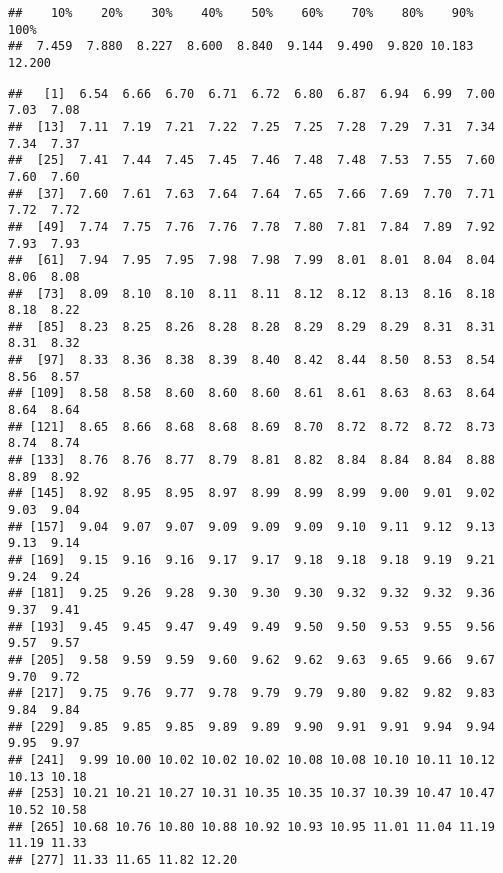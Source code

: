 \documentclass[
]{article}
\newenvironment{Shaded}{\begin{snugshade}}{\end{snugshade}}
\newcommand{\AttributeTok}[1]{\textcolor[rgb]{0.13,0.29,0.53}{#1}}
\newcommand{\DecValTok}[1]{\textcolor[rgb]{0.00,0.00,0.81}{#1}}
\newcommand{\FunctionTok}[1]{\textcolor[rgb]{0.13,0.29,0.53}{\textbf{#1}}}
\newcommand{\NormalTok}[1]{#1}
\newcommand{\SpecialCharTok}[1]{\textcolor[rgb]{0.81,0.36,0.00}{\textbf{#1}}}
\begin{document}
\begin{Shaded}
\end{Shaded}

\begin{verbatim}
##    10%    20%    30%    40%    50%    60%    70%    80%    90%   100% 
##  7.459  7.880  8.227  8.600  8.840  9.144  9.490  9.820 10.183 12.200
\end{verbatim}

\begin{Shaded}
\end{Shaded}

\begin{verbatim}
##   [1]  6.54  6.66  6.70  6.71  6.72  6.80  6.87  6.94  6.99  7.00  7.03  7.08
##  [13]  7.11  7.19  7.21  7.22  7.25  7.25  7.28  7.29  7.31  7.34  7.34  7.37
##  [25]  7.41  7.44  7.45  7.45  7.46  7.48  7.48  7.53  7.55  7.60  7.60  7.60
##  [37]  7.60  7.61  7.63  7.64  7.64  7.65  7.66  7.69  7.70  7.71  7.72  7.72
##  [49]  7.74  7.75  7.76  7.76  7.78  7.80  7.81  7.84  7.89  7.92  7.93  7.93
##  [61]  7.94  7.95  7.95  7.98  7.98  7.99  8.01  8.01  8.04  8.04  8.06  8.08
##  [73]  8.09  8.10  8.10  8.11  8.11  8.12  8.12  8.13  8.16  8.18  8.18  8.22
##  [85]  8.23  8.25  8.26  8.28  8.28  8.29  8.29  8.29  8.31  8.31  8.31  8.32
##  [97]  8.33  8.36  8.38  8.39  8.40  8.42  8.44  8.50  8.53  8.54  8.56  8.57
## [109]  8.58  8.58  8.60  8.60  8.60  8.61  8.61  8.63  8.63  8.64  8.64  8.64
## [121]  8.65  8.66  8.68  8.68  8.69  8.70  8.72  8.72  8.72  8.73  8.74  8.74
## [133]  8.76  8.76  8.77  8.79  8.81  8.82  8.84  8.84  8.84  8.88  8.89  8.92
## [145]  8.92  8.95  8.95  8.97  8.99  8.99  8.99  9.00  9.01  9.02  9.03  9.04
## [157]  9.04  9.07  9.07  9.09  9.09  9.09  9.10  9.11  9.12  9.13  9.13  9.14
## [169]  9.15  9.16  9.16  9.17  9.17  9.18  9.18  9.18  9.19  9.21  9.24  9.24
## [181]  9.25  9.26  9.28  9.30  9.30  9.30  9.32  9.32  9.32  9.36  9.37  9.41
## [193]  9.45  9.45  9.47  9.49  9.49  9.50  9.50  9.53  9.55  9.56  9.57  9.57
## [205]  9.58  9.59  9.59  9.60  9.62  9.62  9.63  9.65  9.66  9.67  9.70  9.72
## [217]  9.75  9.76  9.77  9.78  9.79  9.79  9.80  9.82  9.82  9.83  9.84  9.84
## [229]  9.85  9.85  9.85  9.89  9.89  9.90  9.91  9.91  9.94  9.94  9.95  9.97
## [241]  9.99 10.00 10.02 10.02 10.02 10.08 10.08 10.10 10.11 10.12 10.13 10.18
## [253] 10.21 10.21 10.27 10.31 10.35 10.35 10.37 10.39 10.47 10.47 10.52 10.58
## [265] 10.68 10.76 10.80 10.88 10.92 10.93 10.95 11.01 11.04 11.19 11.19 11.33
## [277] 11.33 11.65 11.82 12.20
\end{verbatim}
\end{document}
